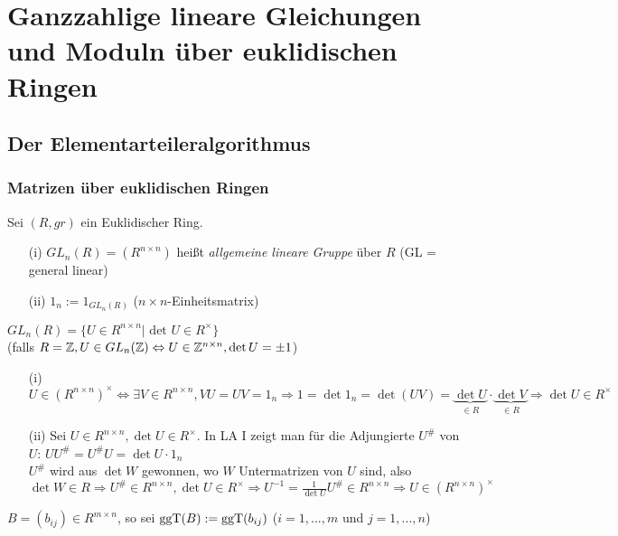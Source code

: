 \documentclass[a4paper,twoside,DIV15,BCOR12mm]{scrbook}
\begin{document}
\chapter{Ganzzahlige lineare Gleichungen und Moduln über euklidischen Ringen}
\section{Der Elementarteileralgorithmus}
\subsection{Matrizen über euklidischen Ringen} Sei $(R, gr)$
ein Euklidischer Ring.
\begin{definition}
    \begin{itemize}
        \item[(i)] $GL_n(R) = (R^{n \times n})$ heißt \emph{allgemeine lineare Gruppe} über $R$ (GL = general linear)
        \item[(ii)] $1_n := 1_{GL_n(R)}$ ($n \times n$-Einheitsmatrix)
    \end{itemize}
\end{definition}
\begin{lemma}
    $GL_n(R) = \{U \in R^{n \times n} \big| \text{ det } U \in R^\times\}$\\
    (falls $R = \mathbb{Z}, U \in GL_n(\mathbb{Z}) \Leftrightarrow U \in \mathbb{Z}^{n \times n}, \det U = \pm 1$)
\end{lemma}
\begin{beweis}
    \begin{itemize}
        \item[(i)] $U \in (R^{n \times n})^\times \Leftrightarrow \exists V \in R^{n \times n}, VU = UV = 1_n \Rightarrow 1 = \det 1_n = \det (UV) = \underbrace{\det U}_{\in R} \cdot \underbrace{\det V}_{\in R} \Rightarrow \det U \in R^\times$
        \item[(ii)] Sei $U \in R^{n \times n}, \det U \in R^\times$. In LA I zeigt man für die Adjungierte $U^\#$ von $U$: $UU^\# = U^\#U = \det U \cdot 1_n$\\
            $U^\#$ wird aus $\det W$ gewonnen, wo $W$ Untermatrizen von $U$ sind, also $\det W \in R \Rightarrow U^\# \in R^{n \times n}, \det U \in R^\times \Rightarrow U^{-1} = \frac{1}{\det U}U^\# \in R^{n \times n} \Rightarrow U \in (R^{n \times n})^\times$
    \end{itemize}
\end{beweis}
\begin{definition}
    $B = (b_{ij}) \in R^{m \times n}$, so sei $\mathop{\rm ggT}\nolimits(B) := \mathop{\rm ggT}\nolimits(b_{ij})$ ($i = 1,...,m$ und $j = 1,...,n$)
\end{definition}
\end{document}
